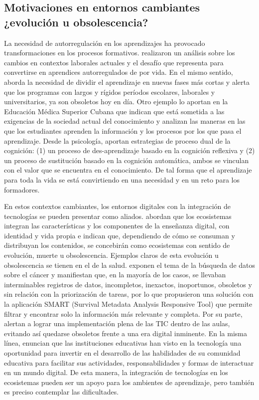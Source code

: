 \documentclass{textolivre}
\begin{document}
\subsection{Motivaciones en entornos cambiantes ¿evolución u obsolescencia?}\label{sec-conduta}
La necesidad de autorregulación en los aprendizajes ha provocado transformaciones en los procesos formativos. \textcite{schwendimann_what_2018} realizaron un análisis sobre los cambios en contextos laborales actuales y el desafío que representa  para convertirse en aprendices autorregulados de por vida. En el mismo sentido, \textcite{kurjak_how_2016} aborda la necesidad de dividir el aprendizaje en nuevas fases más cortas y alerta que los programas con largos y rígidos períodos escolares, laborales y universitarios, ya son obsoletos hoy en día. Otro ejemplo lo aportan \textcite{diaz_quinones_fundamentos_2017} en la Educación Médica Superior Cubana que indican que está sometida a las exigencias de la sociedad actual del conocimiento y analizan las maneras en las que los estudiantes aprenden la información y los procesos por los que pasa el aprendizaje. Desde la psicología, \textcite{helfrich_how_2018} aportan estrategias de proceso dual de la cognición: (1) un proceso de des-aprendizaje basado en la cognición reflexiva y (2) un proceso de sustitución basado en la cognición automática, ambos se vinculan con el valor que se encuentra en el conocimiento. De tal forma que el aprendizaje para toda la vida se está convirtiendo en una necesidad y en un reto para los formadores.

En estos contextos cambiantes, los entornos digitales con la integración de tecnologías se pueden presentar como aliados. \textcite{islas_ecosistemas_2017} abordan que los ecosistemas integran las características y los componentes de la enseñanza digital, con identidad y vida propia e indican que, dependiendo de cómo se  consuman y distribuyan los contenidos, se concebirán como ecosistemas con sentido de evolución, muerte u obsolescencia. Ejemplos claros de esta evolución u obsolescencia se tienen en el de la salud. \textcite{chu_smart_2017} exponen el tema de la búsqueda de datos sobre el cáncer y manifiestan que, en la mayoría de los casos, se llevaban interminables registros de datos, incompletos, inexactos, inoportunos, obsoletos y sin relación con la priorización de tareas, por lo que propusieron una solución con la aplicación SMART (Survival Metadata Analysis Responsive Tool) que permite filtrar y encontrar solo la información más relevante y completa. Por su parte, \textcite{zagami_creating_2018} alertan a lograr una implementación plena de las TIC dentro de las aulas, evitando así quedarse obsoletos frente a una era digital inminente. En la misma línea, \textcite{canchola-gonzalez_concepto_2020} enuncian que las instituciones educativas han visto en la tecnología una oportunidad para invertir en el desarrollo de las habilidades de su comunidad educativa para facilitar sus actividades, responsabilidades y formas de interactuar en un mundo digital. De esta manera, la integración de tecnologías en los ecosistemas pueden ser un apoyo para los ambientes de aprendizaje, pero también es preciso contemplar las dificultades.  
\end{document}
